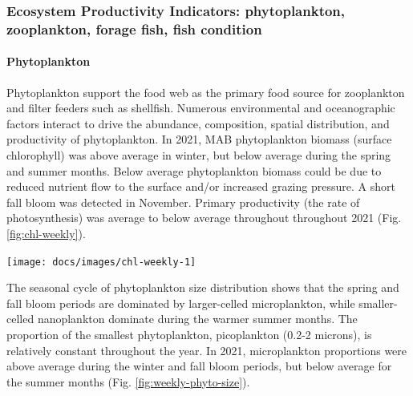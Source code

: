 \documentclass[
  10pt,
]{article}
\let\origfigure\figure
\let\endorigfigure\endfigure
\renewenvironment{figure}[1][2] {
    \expandafter\origfigure\expandafter[H]
} {
    \endorigfigure
}
\begin{document}
\hypertarget{ecosystem-productivity-indicators-phytoplankton-zooplankton-forage-fish-fish-condition}{%
\subsubsection{Ecosystem Productivity Indicators: phytoplankton,
zooplankton, forage fish, fish
condition}\label{ecosystem-productivity-indicators-phytoplankton-zooplankton-forage-fish-fish-condition}}

\hypertarget{phytoplankton}{%
\paragraph{Phytoplankton}\label{phytoplankton}}

Phytoplankton support the food web as the primary food source for
zooplankton and filter feeders such as shellfish. Numerous environmental
and oceanographic factors interact to drive the abundance, composition,
spatial distribution, and productivity of phytoplankton. In 2021, MAB
phytoplankton biomass (surface chlorophyll) was above average in winter,
but below average during the spring and summer months. Below average
phytoplankton biomass could be due to reduced nutrient flow to the
surface and/or increased grazing pressure. A short fall bloom was
detected in November. Primary productivity (the rate of photosynthesis)
was average to below average throughout throughout 2021 (Fig.
\ref{fig:chl-weekly}).

\begin{figure}

{\centering \texttt{[image: docs/images/chl-weekly-1]} 

}

\caption{Weekly chlorophyll concentrations and primary productivity in the Mid-Atlantic are shown by the colored line for 2021 (dashed portion indicates preliminary data from a near real-time satellite source). The long-term mean is shown in black and shading indicates +/- 1 sample standard deviation.}\label{fig:chl-weekly}
\end{figure}

The seasonal cycle of phytoplankton size distribution shows that the
spring and fall bloom periods are dominated by larger-celled
microplankton, while smaller-celled nanoplankton dominate during the
warmer summer months. The proportion of the smallest phytoplankton,
picoplankton (0.2-2 microns), is relatively constant throughout the
year. In 2021, microplankton proportions were above average during the
winter and fall bloom periods, but below average for the summer months
(Fig. \ref{fig:weekly-phyto-size}).
\end{document}
